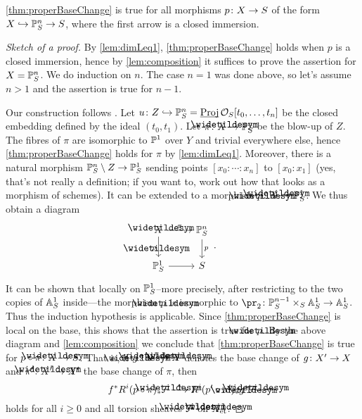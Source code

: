 \documentclass[a4paper, 10pt, oneside, DIV=9, chapterprefix=true, numbers=enddot, bibliography=totoc]{scrbook}
\begin{document}
\begin{lem}\label{lem:PBCprojective}
	\cref{thm:properBaseChange} is true for all morphisms $p\colon X\morphism S$ of the form $X\monomorphism \IP_S^n\morphism S$, where the first arrow is a closed immersion.
\end{lem}
\begin{proof}[Sketch of a proof]
	By \cref{lem:dimLeq1}, \cref{thm:properBaseChange} holds when $p$ is a closed immersion, hence by \cref{lem:composition} it suffices to prove the assertion for $X=\mathbb{P}_S^n$. We do induction on $n$. The case $n=1$ was done above, so let's assume $n>1$ and the assertion is true for $n-1$.
	
	Our construction follows \cite[Arcata~III.4]{sga4.5}. Let $u\colon Z\monomorphism \IP_S^n=\PROJ \Oo_S[t_0,\dotsc,t_n]$ be the closed embedding defined by the ideal $(t_0,t_1)$. Let $\pi\colon \snake{X}\morphism \IP_S^n$ be the blow-up of $Z$. The fibres of $\pi$ are isomorphic to $\mathbb{P}^1$ over $Y$ and trivial everywhere else, hence \cref{thm:properBaseChange} holds for $\pi$ by \cref{lem:dimLeq1}. Moreover, there is a natural morphism $\IP_S^n\setminus Z\morphism \IP_S^1$ sending points $[x_0:\dotsb:x_n]$ to $[x_0:x_1]$ (yes, that's not really a definition; if you want to, work out how that looks as a morphism of schemes). It can be extended to a morphism $\snake{p}\colon \snake{X}\morphism \IP_S^1$. We thus obtain a diagram
	\begin{equation*}
		\begin{tikzcd}
			\snake{X}\dar["\snake{p}"',pos=0.57]\rar["\pi"] & \IP_S^n\dar["p"]\\
			\IP_S^1\rar &S
		\end{tikzcd}\,.
	\end{equation*}
	It can be shown that locally on $\mathbb{P}_S^1$--more precisely, after restricting to the two copies of $\mathbb{A}_S^1$ inside---the morphism $\snake{p}$ is isomorphic to $\pr_2\colon \IP_S^{n-1}\times_S\IA_S^1\morphism \IA_S^1$. Thus the induction hypothesis is applicable. Since \cref{thm:properBaseChange} is local on the base, this shows that the assertion is true for $\snake{p}$. By the above diagram and \cref{lem:composition} we conclude that \cref{thm:properBaseChange} is true for $p\circ \pi\colon \snake{X}\morphism S$. That is, if $\snake{g}\colon \snake{X}'\morphism\snake{X}$ denotes the base change of $g\colon X'\morphism X$ and $\pi'\colon \snake{X}'\morphism X'$ the base change of $\pi$, then
	\begin{equation*}
		f^*R^i(p\circ \pi)_*\snake{\Ff}\isomorphism R^i(p'\circ \pi')_*\snake{g}^*\snake{\Ff}
	\end{equation*}
	holds for all $i\geq 0$ and all torsion sheaves $\snake{\Ff}$ on $\snake{X}_\et$.
	

\end{proof}
\end{document}
